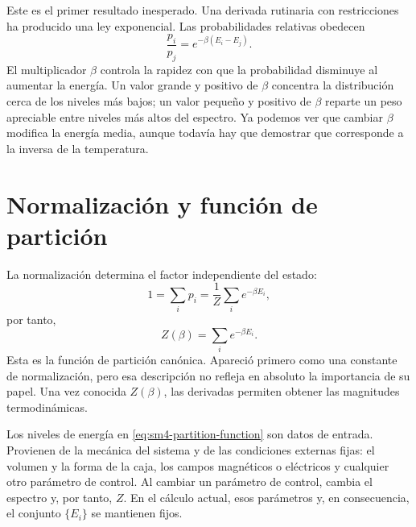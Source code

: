Este es el primer resultado inesperado. Una derivada rutinaria con restricciones ha producido una ley exponencial. Las probabilidades relativas obedecen
\begin{equation}
 \frac{p_i}{p_j}=e^{-\beta(E_i-E_j)}.
 \label{eq:sm4-relative-weight}
\end{equation}
El multiplicador \(\beta\) controla la rapidez con que la probabilidad disminuye al aumentar la energía. Un valor grande y positivo de \(\beta\) concentra la distribución cerca de los niveles más bajos; un valor pequeño y positivo de \(\beta\) reparte un peso apreciable entre niveles más altos del espectro. Ya podemos ver que cambiar \(\beta\) modifica la energía media, aunque todavía hay que demostrar que corresponde a la inversa de la temperatura.

\section{Normalización y función de partición}

La normalización determina el factor independiente del estado:
\begin{equation}
 1=\sum_i p_i
 =\frac{1}{Z}\sum_i e^{-\beta E_i},
\end{equation}
por tanto,
\begin{equation}
 Z(\beta)=\sum_i e^{-\beta E_i}.
 \label{eq:sm4-partition-function}
\end{equation}
Esta es la función de partición canónica. Apareció primero como una constante de normalización, pero esa descripción no refleja en absoluto la importancia de su papel. Una vez conocida \(Z(\beta)\), las derivadas permiten obtener las magnitudes termodinámicas.

Los niveles de energía en \eqref{eq:sm4-partition-function} son datos de entrada. Provienen de la mecánica del sistema y de las condiciones externas fijas: el volumen y la forma de la caja, los campos magnéticos o eléctricos y cualquier otro parámetro de control. Al cambiar un parámetro de control, cambia el espectro y, por tanto, \(Z\). En el cálculo actual, esos parámetros y, en consecuencia, el conjunto \(\{E_i\}\) se mantienen fijos.

\begin{classroomqa}\end{classroomqa}

